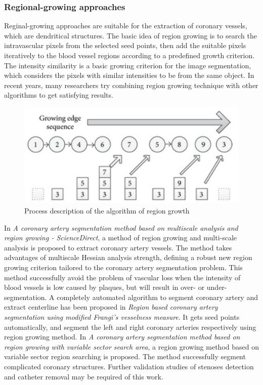 \documentclass[lang=cn,11pt,a4paper,cite=numbers]{elegantpaper}
\begin{document}
\subsubsection{Regional-growing approaches}

Reginal-growing approaches are suitable for the extraction of coronary vessels, which are dendritical structures. The basic idea of region growing is to search the intravascular pixels from the selected seed points, then add the suitable pixels iteratively to the blood vessel regions according to a predefined growth criterion. The intensity similarity is a basic growing criterion for the image segmentation, which considers the pixels with similar intensities to be from the same object. In recent years, many researchers try combining region growing technique with other algorithms to get satisfying results.

\begin{figure}[H]
    \centering
    \includegraphics[scale=1]{./image/文献综述/区域生长.png}
    \caption{Process description of the algorithm of region growth}
    \label{fig:RegionGrowth}
\end{figure}

In \emph{A coronary artery segmentation method based on multiscale analysis and region growing - ScienceDirect}\cite{1}, a method of region growing and multi-scale analysis is proposed to extract coronary artery vessels. The method takes advantages of multiscale Hessian analysis strength, defining a robust new region growing criterion tailored to the coronary artery segmentation problem. This method successfully avoid the problem of vascular loss when the intensity of blood vessels is low caused by plaques, but will result in over- or under-segmentation. A completely automated algorithm to segment coronary artery and extract centerline has been proposed in \emph{Region based coronary artery segmentation using modified Frangi's vesselness measure}\cite{2}. It gets seed points automatically, and segment the left and right coronary arteries respectively using region growing method. In \emph{A coronary artery segmentation method based on region growing with variable sector search area}\cite{3}, a region growing method based on variable sector region searching is proposed. The method successfully segment complicated coronary structures. Further validation studies of stenoses detection and catheter removal may be required of this work.
\end{document}
